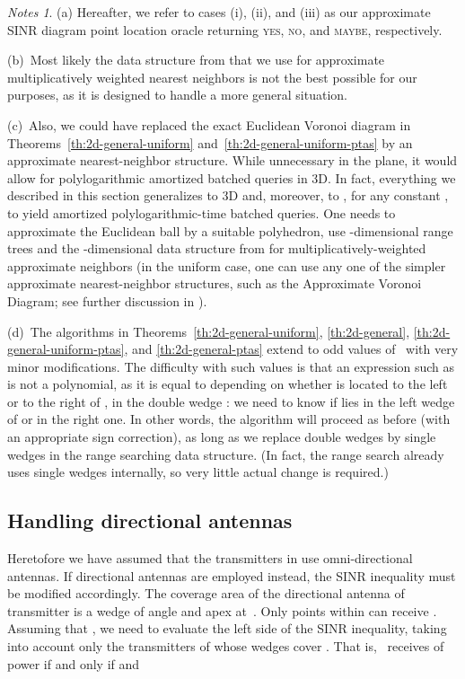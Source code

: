 \documentclass[11pt]{article}
\theoremstyle{remark}
\newtheorem*{notes}{Notes}
\begin{document}
\begin{notes}
  (a) Hereafter, we refer to cases (i), (ii), and (iii) as our approximate SINR diagram point location oracle returning \textsc{yes}, \textsc{no}, and \textsc{maybe}, respectively.

  (b)~Most likely the data structure from \cite{wann} that we use for approximate multiplicatively weighted nearest neighbors is not the best possible for our purposes, as it is designed to handle a more general situation.

  (c)~Also, we could have replaced the exact Euclidean Voronoi diagram in Theorems~\ref{th:2d-general-uniform} and~\ref{th:2d-general-uniform-ptas} by an approximate nearest-neighbor structure.  While unnecessary in the plane, it would allow for polylogarithmic amortized batched queries in 3D. In fact, everything we described in this section generalizes to 3D and, moreover, to , for any constant , to yield amortized polylogarithmic-time batched queries.  One needs to approximate the Euclidean ball by a suitable polyhedron, use -dimensional range trees and the -dimensional data structure from \cite{wann} for multiplicatively-weighted approximate neighbors (in the uniform case, one can use any one of the simpler approximate nearest-neighbor structures, such as the Approximate Voronoi Diagram; see further discussion in \cite{wann}).

  (d)~The algorithms in Theorems~\ref{th:2d-general-uniform}, \ref{th:2d-general}, \ref{th:2d-general-uniform-ptas}, and \ref{th:2d-general-ptas} extend to odd values of~ with very minor modifications.  The difficulty with such values is that an expression such as  is not a polynomial, as it is equal to  depending on whether  is located to the left or to the right of , in the double wedge : we need to know if  lies in the left wedge of  or in the right one.  In other words, the algorithm will proceed as before (with an appropriate sign correction), as long as we replace double wedges by single wedges in the range searching data structure.  (In fact, the range search already uses single wedges internally, so very little actual change is required.)
\end{notes}

\subsection{Handling directional antennas}
\label{sec:dir_antennas}


Heretofore
we have assumed that the transmitters in  use omni-directional antennas.  If directional antennas are employed instead, the SINR inequality must be modified accordingly.
The coverage area of the directional antenna of transmitter  is a wedge  of angle  and apex at~. 
Only points within  can receive .
Assuming that , 
we need to evaluate the left side of the SINR inequality, taking into account only the transmitters of  whose wedges cover .
That is, ~receives  of power  if and only if  and 
\end{document}
